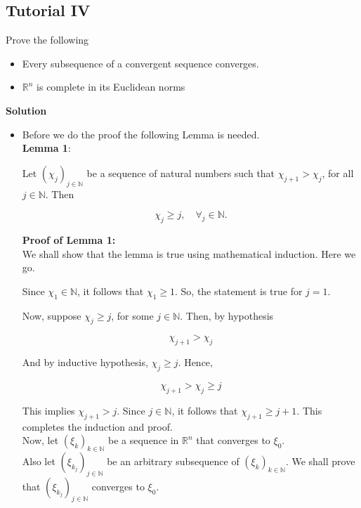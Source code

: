 \documentclass{article}
\begin{document}
\subsection{Tutorial IV}
Prove the following
\begin{itemize}
    \item Every subsequence of a convergent sequence converges.
    \item $\mathbb{R}^n$ is complete in its Euclidean norms
\end{itemize}

\textbf{Solution}\\
\begin{itemize}
    \item Before we do the proof the following Lemma is needed.\\

\textbf{Lemma 1}:

Let $\left(\chi_{j}\right)_{j \in \mathbb{N}}$ be a sequence of natural numbers such that $\chi_{j+1}> \chi_{j}$, for all $j \in \mathbb{N}$. Then

$$
\chi_{j} \geq j, \quad \forall_j \in \mathbb{N} .
$$

\textbf{Proof of Lemma 1:}\\

We shall show that the lemma is true using mathematical induction. Here we go.

Since $\chi_{1} \in \mathbb{N}$, it follows that $\chi_{1} \geq 1$. So, the statement is true for $j=1$.

Now, suppose $\chi_{j} \geq j$, for some $j \in \mathbb{N}$. Then, by hypothesis

$$
\chi_{j+1}>\chi_{j}
$$

And by inductive hypothesis, $\chi_{j} \geq j$. Hence,

$$
\chi_{j+1}>\chi_{j} \geq j
$$

This implies $\chi_{j+1}>j$. Since $j \in \mathbb{N}$, it follows that $\chi_{j+1} \geq j+1$. This completes the induction and proof.\\


Now, let $\left(\xi_{k}\right)_{k \in \mathbb{N}}$ be a sequence in $\mathbb{R}^{n}$ that converges to $\xi_{0}$. \\
Also let $\left(\xi_{k_{j}}\right)_{j \in \mathbb{N}}$ be an arbitrary subsequence of $\left(\xi_{k}\right)_{k \in \mathbb{N}}$. We shall prove that $\left(\xi_{k_{j}}\right)_{j \in \mathbb{N}}$ converges to $\xi_{0}$.\\


\end{itemize}
\end{document}
